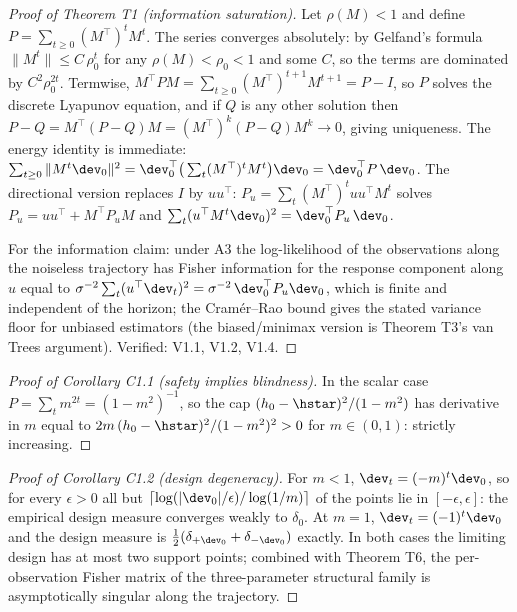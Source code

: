 \documentclass[11pt]{article}
\begin{document}
\begin{proof}[Proof of Theorem T1 (information saturation)]
Let $\rho(M) < 1$ and define $P = \sum_{t\ge 0} (M^\top)^t M^t$. The series
converges absolutely: by Gelfand's formula $\|M^t\| \le C\,\rho_0^t$ for any
$\rho(M) < \rho_0 < 1$ and some $C$, so the terms are dominated by
$C^2\rho_0^{2t}$. Termwise,
$M^\top P M = \sum_{t \ge 0} (M^\top)^{t+1}M^{t+1} = P - I$, so $P$ solves
the discrete Lyapunov equation, and if $Q$ is any other solution then
$P - Q = M^\top (P-Q) M = (M^\top)^k (P-Q) M^k \to 0$, giving uniqueness.
The energy identity is immediate:
$\sum_{t\ge 0} \|M^t \dev_0\|^2 = \dev_0^\top \big(\sum_t (M^\top)^t M^t\big)
\dev_0 = \dev_0^\top P\,\dev_0$. The directional version replaces $I$ by
$uu^\top$: $P_u = \sum_t (M^\top)^t uu^\top M^t$ solves
$P_u = uu^\top + M^\top P_u M$ and
$\sum_t (u^\top M^t \dev_0)^2 = \dev_0^\top P_u\,\dev_0$.

For the information claim: under A3 the log-likelihood of the observations
along the noiseless trajectory has Fisher information for the response
component along $u$ equal to $\sigma^{-2}\sum_t (u^\top \dev_t)^2 =
\sigma^{-2}\,\dev_0^\top P_u \dev_0$, which is finite and independent of the
horizon; the Cram\'er--Rao bound gives the stated variance floor for
unbiased estimators (the biased/minimax version is Theorem T3's van Trees
argument). Verified: V1.1, V1.2, V1.4.
\end{proof}

\begin{proof}[Proof of Corollary C1.1 (safety implies blindness)]
In the scalar case $P = \sum_t m^{2t} = (1-m^2)^{-1}$, so the cap
$(h_0-\hstar)^2/(1-m^2)$ has derivative in $m$ equal to
$2m\,(h_0-\hstar)^2/(1-m^2)^2 > 0$ for $m \in (0,1)$: strictly increasing.
\end{proof}

\begin{proof}[Proof of Corollary C1.2 (design degeneracy)]
For $m < 1$, $\dev_t = (-m)^t \dev_0$, so for every $\epsilon > 0$ all but
$\lceil \log(|\dev_0|/\epsilon)/\log(1/m)\rceil$ of the points lie in
$[-\epsilon, \epsilon]$: the empirical design measure converges weakly to
$\delta_0$. At $m = 1$, $\dev_t = (-1)^t \dev_0$ and the design measure is
$\tfrac{1}{2}(\delta_{+\dev_0} + \delta_{-\dev_0})$ exactly. In both cases
the limiting design has at most two support points; combined with Theorem
T6, the per-observation Fisher matrix of the three-parameter structural
family is asymptotically singular along the trajectory.
\end{proof}
\end{document}

